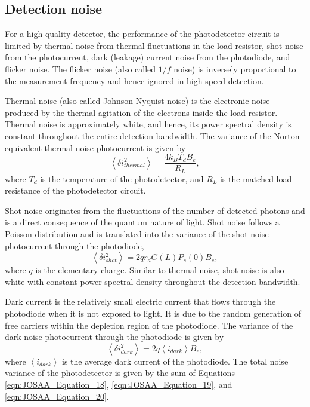 \subsection{Detection noise}

For a high-quality detector, the performance of the photodetector circuit is limited by thermal noise from thermal fluctuations in the load resistor, shot noise from the photocurrent, dark (leakage) current noise from the photodiode, and flicker noise. The flicker noise (also called $1/f$ noise) is inversely proportional to the measurement frequency and hence ignored in high-speed detection.

Thermal noise (also called Johnson-Nyquist noise) is the electronic noise produced by the thermal agitation of the electrons inside the load resistor. Thermal noise is approximately white, and hence, its power spectral density is constant throughout the entire detection bandwidth. The variance of the Norton-equivalent thermal noise photocurrent is given by
\begin{equation}
\left\langle \delta i_{thermal}^2\right\rangle = \frac{4 k_B T_d B_e}{R_L},\label{eqn:JOSAA_Equation_18}
\end{equation}
where $T_d$ is the temperature of the photodetector, and $R_L$ is the matched-load resistance of the photodetector circuit.

Shot noise originates from the fluctuations of the number of detected photons and is a direct consequence of the quantum nature of light. Shot noise follows a Poisson distribution and is translated into the variance of the shot noise photocurrent through the photodiode,
\begin{equation}
\left\langle \delta i_{shot}^2\right\rangle = 2 q r_d G(L) P_s(0) B_e,\label{eqn:JOSAA_Equation_19}
\end{equation}
where $q$ is the elementary charge. Similar to thermal noise, shot noise is also white with constant power spectral density throughout the detection bandwidth.

Dark current is the relatively small electric current that flows through the photodiode when it is not exposed to light. It is due to the random generation of free carriers within the depletion region of the photodiode. The variance of the dark noise photocurrent through the photodiode is given by
\begin{equation}
\left\langle \delta i_{dark}^2\right\rangle = 2 q \left\langle i_{dark}\right\rangle B_e,\label{eqn:JOSAA_Equation_20}
\end{equation}
where $\left\langle i_{dark}\right\rangle$ is the average dark current of the photodiode. The total noise variance of the photodetector is given by the sum of Equations \eqref{eqn:JOSAA_Equation_18}, \eqref{eqn:JOSAA_Equation_19}, and \eqref{eqn:JOSAA_Equation_20}.


